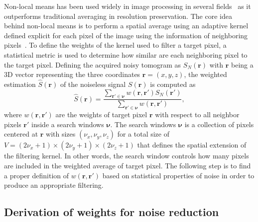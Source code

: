 Non-local means has been used widely in image processing in several fields~\cite{Deledalle2015_NLSAR,Lu2012_Nonlocal,Yu2016_Probabilitybased,Coupe2008_Optimized} as it outperforms traditional averaging in resolution preservation. The core idea behind non-local means is to perform a spatial average using an adaptive kernel defined explicit for each pixel of the image using the information of neighboring pixels~\cite{Cuartas-Velez2018_Volumetric}. To define the weights of the kernel used to filter a target pixel, a statistical metric is used to determine how similar are each neighboring pixel to the target pixel. Defining the acquired noisy tomogram as $S_N(\bm{r})$ with $\bm{r}$ being a 3D vector representing the three coordinates $\bm{r}=(x,y,z)$, the weighted estimation $\hat{S}(\bm{r})$ of the noiseless signal $S(\bm{r})$ is computed as
\begin{equation}\label{eq:NLM}
    \hat{S}(\mathbf{r}) = \frac{\sum_{\bm{r}'\in \bm{\nu}} w(\bm{r}, \bm{r}') S_N(\bm{r}')}{\sum_{\bm{r}'\in \bm{\nu}} w(\bm{r}, \bm{r}')},
\end{equation}
where $w(\bm{r}, \bm{r}')$ are the weights of target pixel $\bm{r}$ with respect to all neighbor pixels $\bm{r}'$ inside a search windows $\bm{\nu}$. The search windows $\bm{\nu}$ is a collection of pixels centered at $\bm{r}$ with sizes $(\nu_x, \nu_y, \nu_z)$ for a total size of $V=(2\nu_x+1)\times(2\nu_y+1)\times(2\nu_z+1)$ that defines the spatial extension of the filtering kernel. In other words, the search window controls how many pixels are included in the weighted average of target pixel. The following step is to find a proper definition of $w(\bm{r}, \bm{r}')$ based on statistical properties of noise in order to produce an appropriate filtering.

\subsection{Derivation of weights for noise reduction}

